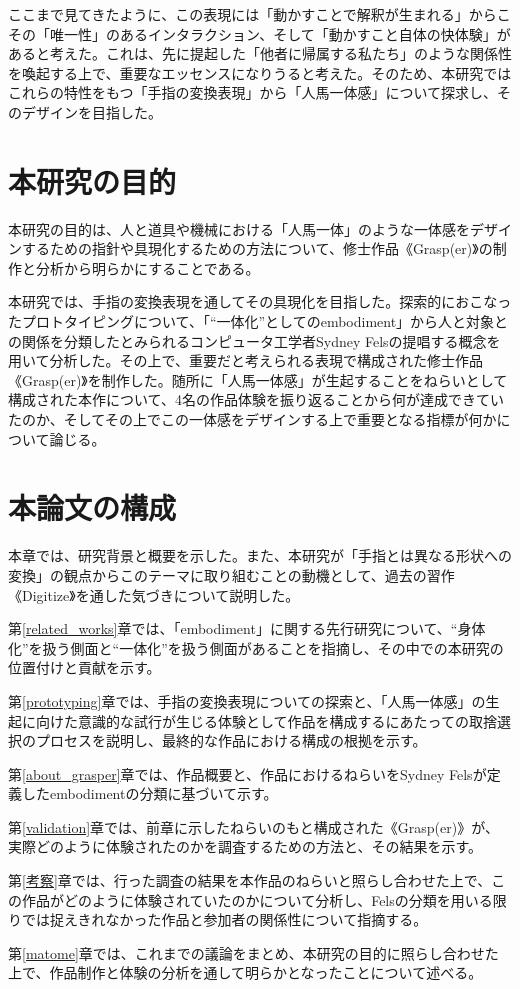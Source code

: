 ここまで見てきたように、この表現には「動かすことで解釈が生まれる」からこその「唯一性」のあるインタラクション、そして「動かすこと自体の快体験」があると考えた。これは、先に提起した「他者に帰属する私たち」のような関係性を喚起する上で、重要なエッセンスになりうると考えた。そのため、本研究ではこれらの特性をもつ「手指の変換表現」から「人馬一体感」について探求し、そのデザインを目指した。

\section{本研究の目的}

本研究の目的は、人と道具や機械における「人馬一体」のような一体感をデザインするための指針や具現化するための方法について、修士作品《Grasp(er)》の制作と分析から明らかにすることである。

本研究では、手指の変換表現を通してその具現化を目指した。探索的におこなったプロトタイピングについて、「``一体化''としてのembodiment」から人と対象との関係を分類したとみられるコンピュータ工学者Sydney Felsの提唱する概念を用いて分析した。その上で、重要だと考えられる表現で構成された修士作品《Grasp(er)》を制作した。随所に「人馬一体感」が生起することをねらいとして構成された本作について、4名の作品体験を振り返ることから何が達成できていたのか、そしてその上でこの一体感をデザインする上で重要となる指標が何かについて論じる。

\section{本論文の構成}
本章では、研究背景と概要を示した。また、本研究が「手指とは異なる形状への変換」の観点からこのテーマに取り組むことの動機として、過去の習作《Digitize》を通した気づきについて説明した。

第\ref{related_works}章では、「embodiment」に関する先行研究について、``身体化''を扱う側面と``一体化''を扱う側面があることを指摘し、その中での本研究の位置付けと貢献を示す。

第\ref{prototyping}章では、手指の変換表現についての探索と、「人馬一体感」の生起に向けた意識的な試行が生じる体験として作品を構成するにあたっての取捨選択のプロセスを説明し、最終的な作品における構成の根拠を示す。

第\ref{about_grasper}章では、作品概要と、作品におけるねらいをSydney Felsが定義したembodimentの分類に基づいて示す。

第\ref{validation}章では、前章に示したねらいのもと構成された《Grasp(er)》が、実際どのように体験されたのかを調査するための方法と、その結果を示す。

第\ref{考察}章では、行った調査の結果を本作品のねらいと照らし合わせた上で、この作品がどのように体験されていたのかについて分析し、Felsの分類を用いる限りでは捉えきれなかった作品と参加者の関係性について指摘する。

第\ref{matome}章では、これまでの議論をまとめ、本研究の目的に照らし合わせた上で、作品制作と体験の分析を通して明らかとなったことについて述べる。